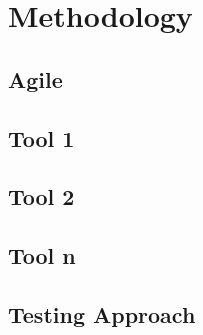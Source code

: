 \section{Methodology}
	\subsection{Agile}
	\subsection{Tool 1}
	\subsection{Tool 2}
	\subsection{Tool n}
	\subsection{Testing Approach}